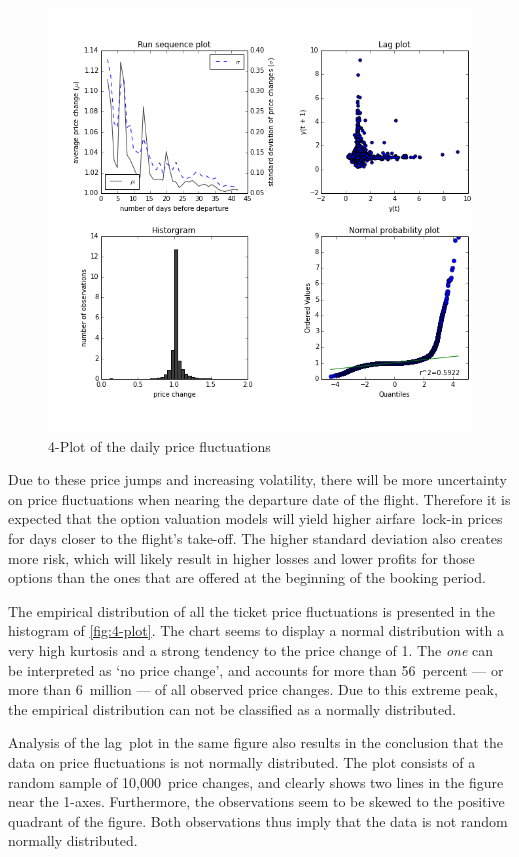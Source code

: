 \begin{figure}
\centering
\includegraphics[width=.8\textwidth]{figures/4-plot}
\caption{4-Plot of the daily price fluctuations}
\label{fig:4-plot}
\end{figure}


Due to these price jumps and increasing volatility, there will be more uncertainty on price fluctuations when nearing the departure date of the flight. Therefore it is expected that the option valuation models will yield higher airfare~lock-in prices for days closer to the flight's take-off. The higher standard deviation also creates more risk, which will likely result in higher losses and lower profits for those options than the ones that are offered at the beginning of the booking period.

The empirical distribution of all the ticket price fluctuations is presented in the histogram of \autoref{fig:4-plot}. The chart seems to display a normal distribution with a very high kurtosis and a strong tendency to the price change of 1. The \emph{one} can be interpreted as `no price change', and accounts for more than 56~percent --- or more than 6~million --- of all observed price changes. Due to this extreme peak, the empirical distribution can not be classified as a normally distributed.

Analysis of the lag~plot in the same figure also results in the conclusion that the data on price fluctuations is not normally distributed. The plot consists of a random sample of 10,000~price changes, and clearly shows two lines in the figure near the 1-axes. Furthermore, the observations seem to be skewed to the positive quadrant of the figure. Both observations thus imply that the data is not random normally distributed.


